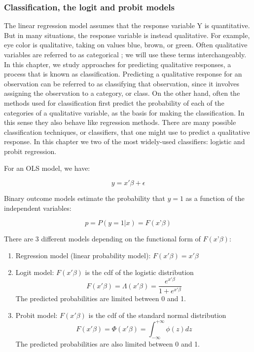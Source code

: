 \subsubsection{Classification, the logit and probit models}
The linear regression model assumes that the response variable Y is quantitative. But in many
situations, the response variable is instead qualitative. For example, eye color is qualitative,
taking on values blue, brown, or green. Often qualitative variables are referred to as categorical ;
we will use these terms interchangeably. In this chapter, we study approaches for predicting
qualitative responses, a process that is known as classification. Predicting a qualitative response
for an observation can be referred to as classifying that observation, since it involves assigning
the observation to a category, or class. On the other hand, often the methods used for
classification first predict the probability of each of the categories of a qualitative variable, as
the basis for making the classification. In this sense they also behave like regression methods.
There are many possible classification techniques, or classifiers, that one might use to predict a
qualitative response. In this chapter we two of the most widely-used classifiers: logistic and
probit regression.

For an OLS model, we have:

\begin{equation}
    y = x'\beta + \epsilon
\end{equation}

Binary outcome models estimate the probability that $y=1$ as a function of the independent variables:

\begin{equation}
    p = P(y=1 | x) = F(x’\beta)
\end{equation}

There are 3 different models depending on the functional form of $F(x’\beta)$:

\begin{enumerate}
    \item Regression model (linear probability model): $F(x'\beta) = x'\beta$
    \item Logit model: $F(x'\beta)$ is the cdf of the logistic distribution
    \begin{equation}
        F(x'\beta) = \Lambda(x'\beta) = \frac{e^{x'\beta}}{1+e^{x'\beta}}
    \end{equation}
    The predicted probabilities are limited between 0 and 1.
    \item Probit model: $F(x'\beta)$ is the cdf of the standard normal distribution
    \begin{equation}
        F(x'\beta) = \Phi(x'\beta) = \int_{-\infty}^{+\infty} \phi(z)dz
    \end{equation}
    The predicted probabilities are also limited between 0 and 1.
\end{enumerate}

